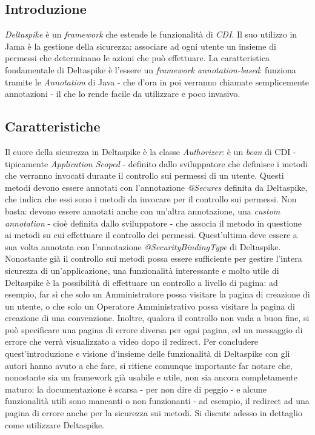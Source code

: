 \subsection{Introduzione}
\textsl{Deltaspike} è un \textit{framework} che estende le funzionalità di \textsl{CDI}. Il suo utilizzo in Jama è la gestione della sicurezza: associare ad ogni utente un insieme di permessi che determinano le azioni che può effettuare.
La caratteristica fondamentale di Deltaspike è l'essere un \textit{framework annotation-based}: funziona tramite le \textsl{Annotation} di Java - che d'ora in poi verranno chiamate semplicemente annotazioni - il che lo rende facile da utilizzare e poco invasivo.

\subsection{Caratteristiche}
Il cuore della sicurezza in Deltaspike è la classe \textsl{Authorizer}: è un \textit{bean} di CDI - tipicamente \textsl{Application Scoped} - definito dallo sviluppatore che definisce i metodi che verranno invocati durante il controllo sui permessi di un utente. Questi metodi devono essere annotati con l'annotazione \textsl{@Secures} definita da Deltaspike, che indica che essi sono i metodi da invocare per il controllo sui permessi. Non basta: devono essere annotati anche con un'altra annotazione, una \textsl{custom annotation} - cioè definita dallo sviluppatore - che associa il metodo in questione ai metodi su cui effettuare il controllo dei permessi. Quest'ultima deve essere a sua volta annotata con l'annotazione \textsl{@SecurityBindingType} di Deltaspike.\newline
Nonostante già il controllo sui metodi possa essere sufficiente per gestire l'intera sicurezza di un'applicazione, una funzionalità interessante e molto utile di Deltaspike è la possibilità di effettuare un controllo a livello di pagina: ad esempio, far sì che solo un Amministratore possa visitare la pagina di creazione di un utente, o che solo un Operatore Amministrativo possa visitare la pagina di creazione di una convenzione. Inoltre, qualora il controllo non vada a buon fine, si può specificare una pagina di errore diversa per ogni pagina, ed un messaggio di errore che verrà visualizzato a video dopo il redirect.\newline
Per concludere quest'introduzione e visione d'insieme delle funzionalità di Deltaspike con gli autori hanno avuto a che fare, si ritiene comunque importante far notare che, nonostante sia un framework già usabile e utile, non sia ancora completamente maturo: la documentazione è scarsa - per non dire di peggio - e alcune funzionalità utili sono mancanti o non funzionanti - ad esempio, il redirect ad una pagina di errore anche per la sicurezza sui metodi.\newline
Si discute adesso in dettaglio come utilizzare Deltaspike.



